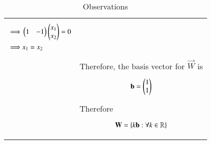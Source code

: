 \documentclass[journal,12pt]{IEEEtran}
\begin{document}
\begin{longtable}{|l|l|}
{\begin{align}
    \implies&\begin{pmatrix}1&-1\end{pmatrix}\begin{pmatrix}x_1\\x_2\end{pmatrix}=0\\
    \implies&x_1=x_2
\end{align}}\\&Therefore, the basis vector for $\vec{W}$ is\\&\parbox{15cm}{\begin{align}
    \mathbf{b}=\begin{pmatrix}1\\1\end{pmatrix}\label{basis}
\end{align}}\\&Therefore\\&\parbox{15cm}{\begin{align}
    \mathbf{W}=\left\{k\mathbf{b}:\forall k\in\mathbb{R}\right\}\label{Wkb}
\end{align}}\\
\hline
\caption{Observations}
\label{obs}
\end{longtable}
\renewcommand{\thetable}{3}
\end{document}
